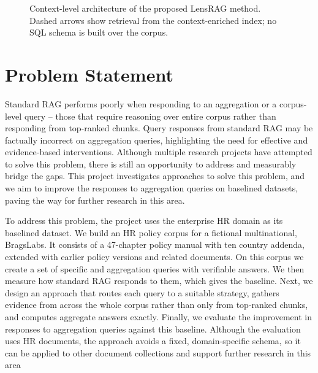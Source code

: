 \documentclass[11pt,letterpaper,oneside]{report}
\begin{document}
\begin{figure}[htbp]
\caption{Context-level architecture of the proposed LensRAG method. Dashed
arrows show retrieval from the context-enriched index; no SQL schema is built
over the corpus.}
\label{fig:context-arch}
\end{figure}

\FloatBarrier   %
\section{Problem Statement}
\label{sec:problem}

Standard RAG performs poorly when responding to an aggregation or a corpus-level query -- those that
require reasoning over entire corpus rather than responding from top-ranked chunks. Query responses from
standard RAG may be factually incorrect on aggregation queries, highlighting the need for effective and
evidence-based interventions. Although multiple research projects have attempted to solve this problem,
there is still an opportunity to address and measurably bridge the gaps. This project investigates approaches
to solve this problem, and we aim to improve the responses to aggregation queries on baselined datasets,
paving the way for further research in this area.

To address this problem, the project uses the enterprise HR domain as its baselined dataset. We build
an HR policy corpus for a fictional multinational, BragsLabs.
It consists of a 47-chapter policy manual with ten country addenda, extended with earlier policy versions
and related documents. On this corpus we create a set of specific and aggregation queries with verifiable
answers. We then measure how standard RAG responds to them, which gives the baseline. Next, we design
an approach that routes each query to a suitable strategy, gathers evidence from across the whole corpus
rather than only from top-ranked chunks, and computes aggregate answers exactly. Finally, we evaluate the
improvement in responses to aggregation queries against this baseline. Although the evaluation uses HR
documents, the approach avoids a fixed, domain-specific schema, so it can be applied to other document
collections and support further research in this area
\end{document}
